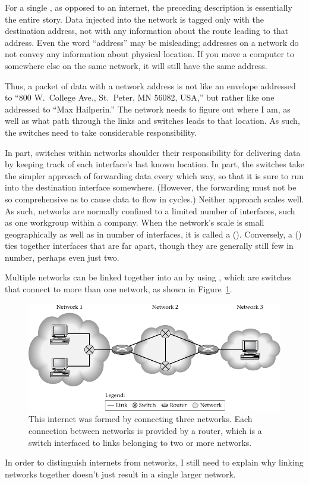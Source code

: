 For a single , as opposed to an internet, the preceding
description is essentially the entire story.  Data injected into the
network is tagged only with the destination address, not with any
information about the route leading to that address.  Even the word
``address'' may be misleading; addresses on a network do not convey
any information about physical location.  If you move a computer
to somewhere else on the same network, it will
still have the same address.

Thus, a packet of data with a network address is not like an envelope
addressed to ``800 W.\ College Ave., St.\ Peter, MN 56082, USA,'' but rather
like one addressed to ``Max Hailperin.''  The network needs to figure
out where I am, as well as what path through the links and
switches leads to that location.  As such, the switches
need to take considerable responsibility.

In part, switches within networks shoulder their
responsibility for delivering data by keeping track of each
interface's last known location.  In part, the switches take the
simpler approach of forwarding data every which way, so that it is
sure to run into the destination interface somewhere.  (However, the
forwarding must not be so comprehensive as to cause data to flow in
cycles.)  Neither approach scales well.  As such, networks are
normally confined to a limited number of interfaces, such as one workgroup within a company.  When the network's scale is small
geographically as well as in number of interfaces, it is called a
 ().  Conversely, a  () ties together interfaces that are far
apart, though they are generally still few in number, perhaps even
just two.

Multiple networks can be linked together into an 
by using , which are switches that connect to more
than one network, as shown in Figure~\ref{scan-9-2}.
\begin{figure}
\centerline{\includegraphics{hail_f0902}}
\caption{This internet was formed by connecting three networks.
  Each connection between networks is provided by a router, which is a
  switch interfaced to links belonging to two or more networks.}
\label{scan-9-2}
\end{figure}
In order to distinguish internets from networks, I still
need to explain why linking networks together doesn't just result in a single larger network.

